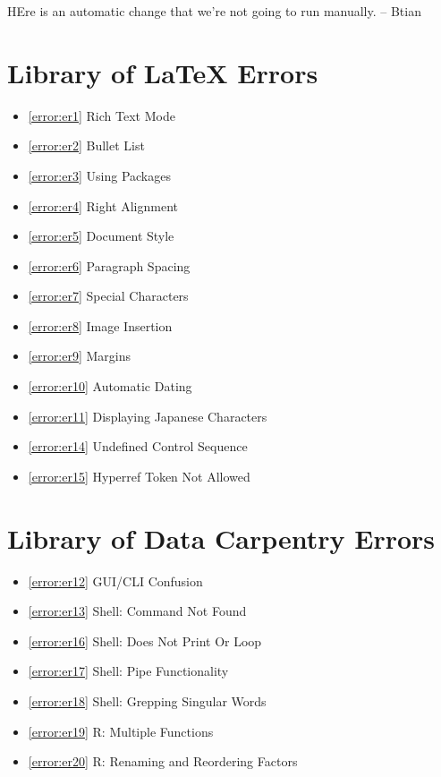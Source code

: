 \documentclass[12pt]{article}
\begin{document}
HEre is an automatic change that we're not going to run manually. -- Btian






\newpage\section{Library of LaTeX Errors}
\begin{itemize}
\renewcommand{\labelitemi}{}
    \item \ref{error:er1} Rich Text Mode 
    \item \ref{error:er2} Bullet List 
    \item \ref{error:er3} Using Packages
    \item \ref{error:er4} Right Alignment
    \item \ref{error:er5} Document Style
    \item \ref{error:er6} Paragraph Spacing
    \item \ref{error:er7} Special Characters
    \item \ref{error:er8} Image Insertion
    \item \ref{error:er9} Margins
    \item \ref{error:er10} Automatic Dating
    \item \ref{error:er11} Displaying Japanese Characters
    \item \ref{error:er14} Undefined Control Sequence
    \item \ref{error:er15} Hyperref Token Not Allowed
\end{itemize}


\section{Library of Data Carpentry Errors}
\begin{itemize}
\renewcommand{\labelitemi}{}
    \item \ref{error:er12} GUI/CLI Confusion
    \item \ref{error:er13} Shell: Command Not Found
    \item \ref{error:er16} Shell: Does Not Print Or Loop
    \item \ref{error:er17} Shell: Pipe Functionality
    \item \ref{error:er18} Shell: Grepping Singular Words
    \item \ref{error:er19} R: Multiple Functions
    \item \ref{error:er20} R: Renaming and Reordering Factors
\end{itemize}
\end{document}

